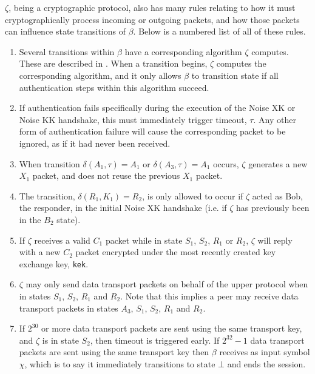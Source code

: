 \documentclass{article}
\begin{document}
\begin{definition}
	$\zeta$, being a cryptographic protocol, also has many rules relating to how it must cryptographically process incoming or outgoing packets, and how those packets can influence state transitions of $\beta$. Below is a numbered list of all of these rules.
	\begin{enumerate}
		\item Several transitions within $\beta$ have a corresponding algorithm $\zeta$ computes. These are described in . When a transition begins, $\zeta$ computes the corresponding algorithm, and it only allows $\beta$ to transition state if all authentication steps within this algorithm succeed.
		\item If authentication fails specifically during the execution of the Noise XK or Noise KK handshake, this must immediately trigger timeout, $\tau$. Any other form of authentication failure will cause the corresponding packet to be ignored, as if it had never been received.
		\item When transition $\delta(A_1, \tau)=A_1$ or $\delta(A_3, \tau)=A_1$ occurs, $\zeta$ generates a new $X_1$ packet, and does not reuse the previous $X_1$ packet.
		\item The transition, $\delta(R_1, K_1)=R_2$, is only allowed to occur if $\zeta$ acted as Bob, the responder, in the initial Noise XK handshake (i.e. if $\zeta$ has previously been in the $B_2$ state).
		\item If $\zeta$ receives a valid $C_1$ packet while in state $S_1$, $S_2$, $R_1$ or $R_2$, $\zeta$ will reply with a new $C_2$ packet encrypted under the most recently created key exchange key, \texttt{kek}.
		\item $\zeta$ may only send data transport packets on behalf of the upper protocol when in states $S_1$, $S_2$, $R_1$ and $R_2$. Note that this implies a peer may receive data transport packets in states $A_3$, $S_1$, $S_2$, $R_1$ and $R_2$.
		\item If $2^{30}$ or more data transport packets are sent using the same transport key, and $\zeta$ is in state $S_2$, then timeout is triggered early. If $2^{32} - 1$ data transport packets are sent using the same transport key then $\beta$ receives as input symbol $\chi$, which is to say it immediately transitions to state $\bot$ and ends the session.
	\end{enumerate}
\end{definition}
\end{document}
